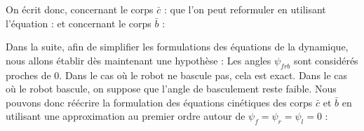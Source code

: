 					On écrit donc, concernant le corps $\bar{c}$ :
					que l'on peut reformuler en utilisant l'équation  :
					et concernant le corps $\bar{b}$ :
					
				
					Dans la suite, afin de simplifier les formulations des équations de la dynamique, nous allons établir dès maintenant une hypothèse : Les angles $\psi_{frb}$ sont considérés proches de $0$.
					Dans le cas où le robot ne bascule pas, cela est exact. Dans le cas où le robot bascule, on suppose que l'angle de basculement reste faible.
					Nous pouvons donc réécrire la formulation des équations cinétiques des corps $\bar{c}$ et $\bar{b}$ en utilisant une approximation au premier ordre autour de $\psi_f=\psi_r=\psi_l=0$ :
					
